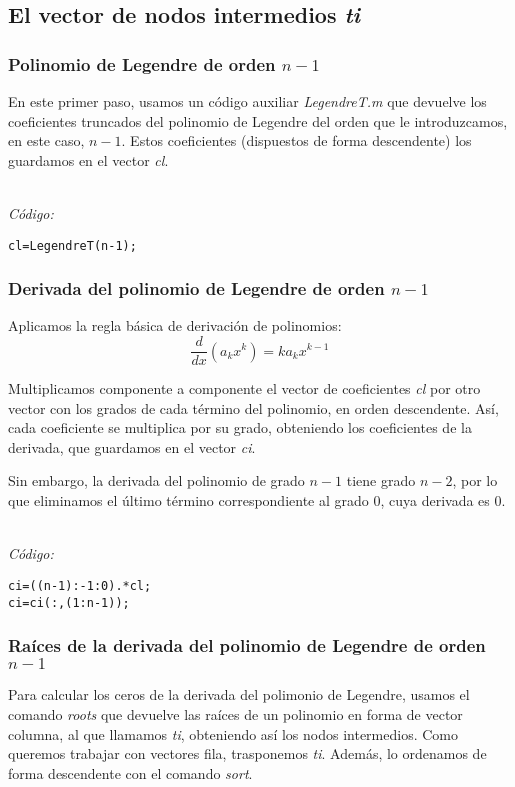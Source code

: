 \documentclass[a4paper]{article}
\begin{document}
\subsection{El vector de nodos intermedios \textit{ti}}
\subsubsection{\boldmath Polinomio de Legendre de orden $n-1$}
En este primer paso, usamos un código auxiliar \textit{LegendreT.m} que devuelve los coeficientes truncados del polinomio de Legendre del orden que le introduzcamos, en este caso, $n-1$. Estos coeficientes (dispuestos de forma descendente) los guardamos en el vector \textit{cl}.

\textit{\\Código:}

\begin{lstlisting}[frame=single, style=Matlab-Pyglike]
cl=LegendreT(n-1);
\end{lstlisting}

\subsubsection{\boldmath Derivada del polinomio de Legendre de orden $n-1$}
Aplicamos la regla básica de derivación de polinomios:
\[
\frac{d}{dx}(a_k x^k)=k a_k x^{k-1}
\]

Multiplicamos componente a componente el vector de coeficientes \textit{cl} por otro vector con los grados de cada término del polinomio, en orden descendente. Así, cada coeficiente se multiplica por su grado, obteniendo los coeficientes de la derivada, que guardamos en el vector \textit{ci}.

Sin embargo, la derivada del polinomio de grado $n-1$ tiene grado $n-2$, por lo que eliminamos el último término correspondiente al grado 0, cuya derivada es 0.

\textit{\\Código:}

\begin{lstlisting}[frame=single, style=Matlab-Pyglike]
ci=((n-1):-1:0).*cl;
ci=ci(:,(1:n-1));
\end{lstlisting}

\subsubsection{\boldmath Raíces de la derivada del polinomio de Legendre de orden $n-1$}
Para calcular los ceros de la derivada del polimonio de Legendre, usamos el comando \textit{roots} que devuelve las raíces de un polinomio en forma de vector columna, al que llamamos \textit{ti}, obteniendo así los nodos intermedios. Como queremos trabajar con vectores fila, trasponemos \textit{ti}. Además, lo ordenamos de forma descendente con el comando \textit{sort}. 
\end{document}
